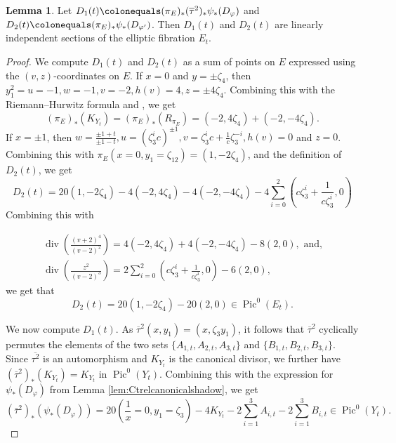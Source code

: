 \documentclass[reqno,10pt]{amsart}
\theoremstyle{definition}
\theoremstyle{definition}
\newtheorem{lem}[thm]{Lemma}
\DeclareMathOperator{\divi}{div}
\DeclareMathOperator{\Pic}{Pic}
\begin{document}
\begin{lem}\label{lem:Ctshadowspushforward}
Let $D_1(t) \colonequals (\pi_{E})_* (\overline{\tau}^2)_* \psi_*(D_{\varphi})$ and $D_2(t) \colonequals (\pi_{E})_*\psi_*
(D_{\varphi'})$. Then $D_1(t)$ and $D_2(t)$ are linearly independent sections of the elliptic fibration $E_t$.
\end{lem}


\begin{proof}
We compute $D_1(t)$ and $D_2(t)$ as a sum of points on $E$ expressed using the $(v,z)$-coordinates on $E$. If $x=0$ and $y=\pm \zeta_{4}$, then $y_1^2 = u = -1, w = -1, v = -2, h(v) = 4, z = \pm  4\zeta_4$.  
Combining this with the Riemann--Hurwitz formula and , we get 
\[(\pi_{E})_*(K_{Y_t}) = (\pi_{E})_*(R_{\pi_{E}})=(-2,4\zeta_4)+(-2,-4\zeta_4).\] 
If $x = \pm 1$, then $w = \frac{\pm 1+t}{\pm 1-t}, u = (\zeta_3^i c)^{\pm 1}, v = \zeta_3^i c + \frac{1}{c}\zeta_3^{-i}, h(v) = 0$  and $z=0$.
Combining this with $\pi_E(x=0,y_1=\zeta_{12}) = (1,-2 \zeta_4)$,  and the definition of $D_2(t)$,  we get  
\[ D_2(t) = 20(1,-2\zeta_4) - 4(-2,4\zeta_4) - 4(-2,-4\zeta_4)- 4\sum_{i=0}^2 \left(c \zeta_3^i +\frac{1}{c\zeta_3^{i}},0 \right)
\] 
Combining this with

\begin{equation}\label{eqn:linearequiv} \begin{split} \divi \left(\frac{(v+2)^4}{(v-2)^2} \right) = 4(-2,4\zeta_4) + 4(-2,-4\zeta_4)-8(2,0), \text{ and,}\\
\divi \left(\frac{z^2}{(v-2)^3} \right) = 2\sum_{i=0}^2 \left(c \zeta_3^i +\frac{1}{c\zeta_3^{i}},0 \right) - 6(2,0), \end{split}\end{equation}
we get that 
\[ D_2(t) =20(1,-2\zeta_4) - 20(2,0) \in \Pic^0(E_t).\] 

We now compute $D_1(t).$ As $\overline\tau^2(x,y_1)
=(x,\zeta_3 y_1)$, it follows that $\overline{\tau}^2$ cyclically permutes the elements of the two sets $\{A_{1,t},A_{2,t},A_{3,t} \}$ and $\{B_{1,t},B_{2,t},B_{3,t} \}$. Since $\overline{\tau^2}$ is an automorphism and $K_{Y_t}$ is the canonical divisor, we further have $(\overline{\tau}^2)_*(K_{Y_t}) = K_{Y_t}$ in $\Pic^0(Y_t)$. Combining this with the expression for
$\psi_{*}(D_{\varphi})$ from Lemma \ref{lem:Ctrelcanonicalshadow}, we get
\[(\bar{\tau}^2)_*(\psi_*(D_\varphi)) = 20 \left(\frac{1}{x} = 0, y_1=\zeta_3 \right) - 4K_{Y_t}-2\sum_{i=1}^3A_{i,t}-2\sum_{i=1}^3B_{i,t} \in \Pic^0(Y_t).\]


\end{proof}
\end{document}
